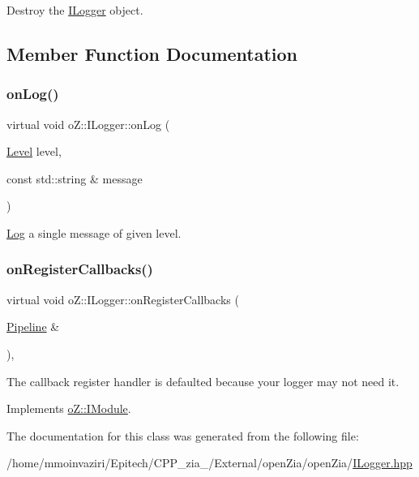 Destroy the \mbox{\hyperlink{classo_z_1_1_i_logger}{I\+Logger}} object. 



\subsection{Member Function Documentation}
\mbox{\label{classo_z_1_1_i_logger_a2e0e168c9218055e41bdd5b57177cba1}} 
\subsubsection{\texorpdfstring{onLog()}{onLog()}}
{\footnotesize\ttfamily virtual void o\+Z\+::\+I\+Logger\+::on\+Log (\begin{DoxyParamCaption}\item[{\mbox{\hyperlink{namespaceo_z_a72fc7662d5f07391ac6f0a5699014bfa}{Level}}}]{level,  }\item[{const std\+::string \&}]{message }\end{DoxyParamCaption})\hspace{0.3cm}{\ttfamily [pure virtual]}}



\mbox{\hyperlink{classo_z_1_1_log}{Log}} a single message of given level. 

\mbox{\label{classo_z_1_1_i_logger_a10732b6da6e8f085c6fe5fa154d361ef}} 
\subsubsection{\texorpdfstring{onRegisterCallbacks()}{onRegisterCallbacks()}}
{\footnotesize\ttfamily virtual void o\+Z\+::\+I\+Logger\+::on\+Register\+Callbacks (\begin{DoxyParamCaption}\item[{\mbox{\hyperlink{classo_z_1_1_pipeline}{Pipeline}} \&}]{ }\end{DoxyParamCaption})\hspace{0.3cm}{\ttfamily [inline]}, {\ttfamily [virtual]}}



The callback register handler is defaulted because your logger may not need it. 



Implements \mbox{\hyperlink{classo_z_1_1_i_module_a3dc905faa6df5e22eecc6ffbc923fd95}{o\+Z\+::\+I\+Module}}.



The documentation for this class was generated from the following file\+:\begin{DoxyCompactItemize}
\item 
/home/mmoinvaziri/\+Epitech/\+C\+P\+P\+\_\+zia\+\_/\+External/open\+Zia/open\+Zia/\mbox{\hyperlink{_i_logger_8hpp}{I\+Logger.\+hpp}}\end{DoxyCompactItemize}
